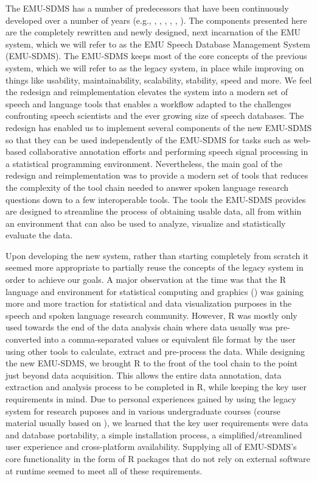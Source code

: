\documentclass[]{book}
\theoremstyle{definition}
\theoremstyle{definition}
\theoremstyle{definition}
\theoremstyle{remark}
\begin{document}
The EMU-SDMS has a number of predecessors that have been continuously
developed over a number of years (e.g., \citet{harrington:csl1993a},
\citet{cassidy:1996a}, \citet{cassidy:sc2001a}, \citet{bombien:2006a},
\citet{harrington:2010a}, \citet{john:2012a}). The components presented
here are the completely rewritten and newly designed, next incarnation
of the EMU system, which we will refer to as the EMU Speech Database
Management System (EMU-SDMS). The EMU-SDMS keeps most of the core
concepts of the previous system, which we will refer to as the legacy
system, in place while improving on things like usability,
maintainability, scalability, stability, speed and more. We feel the
redesign and reimplementation elevates the system into a modern set of
speech and language tools that enables a workflow adapted to the
challenges confronting speech scientists and the ever growing size of
speech databases. The redesign has enabled us to implement several
components of the new EMU-SDMS so that they can be used independently of
the EMU-SDMS for tasks such as web-based collaborative annotation
efforts and performing speech signal processing in a statistical
programming environment. Nevertheless, the main goal of the redesign and
reimplementation was to provide a modern set of tools that reduces the
complexity of the tool chain needed to answer spoken language research
questions down to a few interoperable tools. The tools the EMU-SDMS
provides are designed to streamline the process of obtaining usable
data, all from within an environment that can also be used to analyze,
visualize and statistically evaluate the data.

Upon developing the new system, rather than starting completely from
scratch it seemed more appropriate to partially reuse the concepts of
the legacy system in order to achieve our goals. A major observation at
the time was that the R language and environment for statistical
computing and graphics (\citet{r-core-team:2016a}) was gaining more and
more traction for statistical and data visualization purposes in the
speech and spoken language research community. However, R was mostly
only used towards the end of the data analysis chain where data usually
was pre-converted into a comma-separated values or equivalent file
format by the user using other tools to calculate, extract and
pre-process the data. While designing the new EMU-SDMS, we brought R to
the front of the tool chain to the point just beyond data acquisition.
This allows the entire data annotation, data extraction and analysis
process to be completed in R, while keeping the key user requirements in
mind. Due to personal experiences gained by using the legacy system for
research puposes and in various undergraduate courses (course material
usually based on \citet{harrington:2010a}), we learned that the key user
requirements were data and database portability, a simple installation
process, a simplified/streamlined user experience and cross-platform
availability. Supplying all of EMU-SDMS's core functionality in the form
of R packages that do not rely on external software at runtime seemed to
meet all of these requirements.
\end{document}
